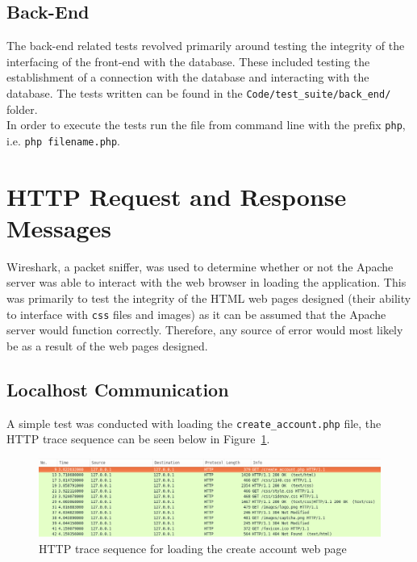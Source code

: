 \documentclass[10pt, a4paper, twocolumn]{scrartcl}
\begin{document}
	\subsection{Back-End}
	
		The back-end related tests revolved primarily around testing the integrity of the interfacing of the front-end with the database. These included testing the establishment of a connection with the database and interacting with the database. The tests written can be found in the \texttt{Code/test\_suite/back\_end/} folder.\\
		
		In order to execute the tests run the file from command line with the prefix \texttt{php}, i.e. \texttt{php filename.php}.
	
	
\section{HTTP Request and Response Messages}

	Wireshark, a packet sniffer, was used to determine whether or not the Apache server was able to interact with the web browser in loading the application. This was primarily to test the integrity of the HTML web pages designed (their ability to interface with \texttt{css} files and images) as it can be assumed that the Apache server would function correctly. Therefore, any source of error would most likely be as a result of the web pages designed.
	
	\subsection{Localhost Communication}	
	
		A simple test was conducted with loading the \texttt{create\_account.php} file, the HTTP trace sequence can be seen below in Figure~\ref{http_create_account}.
		
		\begin{figure}[h!]
			\centering
			\includegraphics[width = \textwidth]{../images/http_create_account.png}
			\caption{HTTP trace sequence for loading the create account web page}
			\label{http_create_account}
		\end{figure}
		
\end{document}
